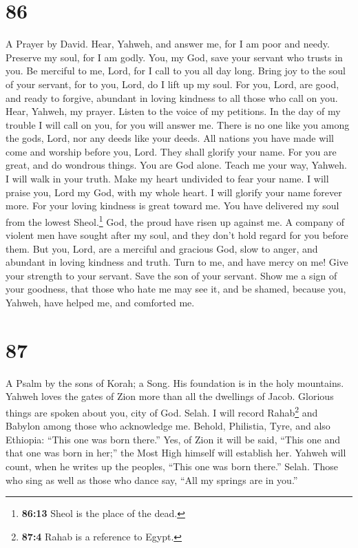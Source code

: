 \hypertarget{section-78}{%
\section{86}\label{section-78}}

A Prayer by David.  Hear, Yahweh, and answer me, for I am
poor and needy.  Preserve my soul, for I am godly. You, my
God, save your servant who trusts in you.  Be merciful to
me, Lord, for I call to you all day long.  Bring joy to
the soul of your servant, for to you, Lord, do I lift up my soul.
 For you, Lord, are good, and ready to forgive, abundant
in loving kindness to all those who call on you.  Hear,
Yahweh, my prayer. Listen to the voice of my petitions. 
In the day of my trouble I will call on you, for you will answer me.
 There is no one like you among the gods, Lord, nor any
deeds like your deeds.  All nations you have made will
come and worship before you, Lord. They shall glorify your name.
 For you are great, and do wondrous things. You are God
alone.  Teach me your way, Yahweh. I will walk in your
truth. Make my heart undivided to fear your name.  I will
praise you, Lord my God, with my whole heart. I will glorify your name
forever more.  For your loving kindness is great toward
me. You have delivered my soul from the lowest Sheol.\footnote{\textbf{86:13}
  Sheol is the place of the dead.}  God, the proud have
risen up against me. A company of violent men have sought after my soul,
and they don't hold regard for you before them.  But you,
Lord, are a merciful and gracious God, slow to anger, and abundant in
loving kindness and truth.  Turn to me, and have mercy on
me! Give your strength to your servant. Save the son of your servant.
 Show me a sign of your goodness, that those who hate me
may see it, and be shamed, because you, Yahweh, have helped me, and
comforted me.

\hypertarget{section-79}{%
\section{87}\label{section-79}}

A Psalm by the sons of Korah; a Song.  His foundation is
in the holy mountains.  Yahweh loves the gates of Zion
more than all the dwellings of Jacob.  Glorious things are
spoken about you, city of God. Selah.  I will record
Rahab\footnote{\textbf{87:4} Rahab is a reference to Egypt.} and Babylon
among those who acknowledge me. Behold, Philistia, Tyre, and also
Ethiopia: ``This one was born there.''  Yes, of Zion it
will be said, ``This one and that one was born in her;'' the Most High
himself will establish her.  Yahweh will count, when he
writes up the peoples, ``This one was born there.'' Selah.
 Those who sing as well as those who dance say, ``All my
springs are in you.''

